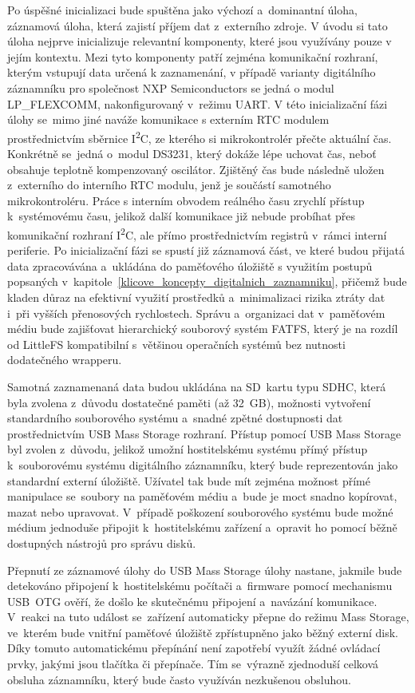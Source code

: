 Po úspěšné inicializaci bude spuštěna jako výchozí a~dominantní úloha, záznamová úloha, která zajistí příjem dat z~externího zdroje. V úvodu si tato úloha nejprve inicializuje relevantní komponenty, které jsou využívány pouze v jejím kontextu. Mezi tyto komponenty patří zejména komunikační rozhraní, kterým vstupují data určená k zaznamenání, v případě varianty digitálního záznamníku pro společnost NXP Semiconductors se jedná o modul LP\_FLEXCOMM, nakonfigurovaný v~režimu UART. V této inicializační fázi úlohy se~mimo jiné naváže komunikace s externím RTC modulem prostřednictvím sběrnice I\textsuperscript{2}C, ze kterého si mikrokontrolér přečte aktuální čas. Konkrétně se~jedná o~modul DS3231, který dokáže lépe uchovat čas, neboť obsahuje teplotně kompenzovaný oscilátor. Zjištěný čas bude následně uložen z~externího do interního RTC modulu, jenž je součástí samotného mikrokontroléru. Práce s interním obvodem reálného času zrychlí přístup k~systémovému času, jelikož další komunikace již nebude probíhat přes komunikační rozhraní I\textsuperscript{2}C, ale přímo prostřednictvím registrů v~rámci interní periferie. Po inicializační fázi se spustí již záznamová část, ve které budou přijatá data zpracovávána a~ukládána do paměťového úložiště s využitím postupů popsaných v~kapitole~\ref{klicove_koncepty_digitalnich_zaznamniku}, přičemž bude kladen důraz na efektivní využití prostředků a~minimalizaci rizika ztráty dat i~při vyšších přenosových rychlostech. Správu a~organizaci dat v~paměťovém médiu bude zajišťovat hierarchický souborový systém FATFS, který je na rozdíl od LittleFS kompatibilní s~většinou operačních systémů bez nutnosti dodatečného wrapperu.

Samotná zaznamenaná data budou ukládána na SD~kartu typu SDHC, která byla zvolena z~důvodu dostatečné paměti (až 32~GB), možnosti vytvoření standardního souborového systému a~snadné zpětné dostupnosti dat prostřednictvím USB Mass Storage rozhraní. Přístup pomocí USB Mass Storage byl zvolen z~důvodu, jelikož umožní hostitelskému systému přímý přístup k~souborovému systému digitálního záznamníku, který bude reprezentován jako standardní externí úložiště. Užívatel tak bude mít zejména možnost přímé manipulace se~soubory na paměťovém médiu a~bude je moct snadno kopírovat, mazat nebo upravovat. V~případě poškození souborového systému bude možné médium jednoduše připojit k~hostitelskému zařízení a~opravit ho pomocí běžně dostupných nástrojů pro správu disků.

Přepnutí ze záznamové úlohy do USB Mass Storage úlohy nastane, jakmile bude detekováno připojení k~hostitelskému počítači a~firmware pomocí mechanismu USB~OTG ověří, že došlo ke skutečnému připojení a~navázání komunikace. V~reakci na tuto událost se~zařízení automaticky přepne do režimu Mass Storage, ve~kterém bude vnitřní paměťové úložiště zpřístupněno jako běžný externí disk. Díky tomuto automatickému přepínání není zapotřebí využít žádné ovládací prvky, jakými jsou tlačítka či přepínače. Tím se~výrazně zjednoduší celková obsluha záznamníku, který bude často využíván nezkušenou obsluhou.

